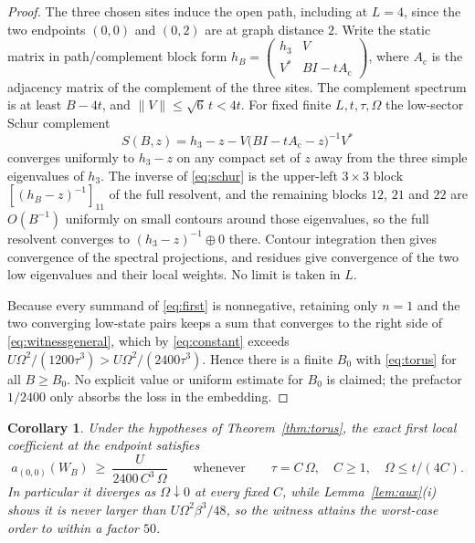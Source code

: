 \documentclass[11pt]{article}
\newtheorem{corollary}[theorem]{Corollary}
\theoremstyle{definition}
\theoremstyle{remark}
\begin{document}
\begin{proof}
The three chosen sites induce the open path, including at $L=4$, since the two
endpoints $(0,0)$ and $(0,2)$ are at graph distance $2$. Write the static matrix in
path/complement block form
$h_B=\begin{pmatrix}h_3&V\\ V^*&BI-tA_{\mathrm{c}}\end{pmatrix}$, where
$A_{\mathrm{c}}$ is the adjacency matrix of the complement of the three sites. The
complement spectrum is at least $B-4t$, and $\|V\|\le\sqrt6\,t<4t$. For fixed finite
$L,t,\tau,\Omega$ the low-sector Schur complement
\begin{equation}
S(B,z)=h_3-z-V\bigl(BI-tA_{\mathrm{c}}-z\bigr)^{-1}V^*
\label{eq:schur}
\end{equation}
converges uniformly to $h_3-z$ on any compact set of $z$ away from the three simple
eigenvalues of $h_3$. The inverse of \eqref{eq:schur} is the upper-left $3\times3$
block $[(h_B-z)^{-1}]_{11}$ of the full resolvent, and the remaining blocks
$12$, $21$ and $22$ are $O(B^{-1})$ uniformly on small contours around those
eigenvalues, so the full resolvent converges to
$(h_3-z)^{-1}\oplus0$ there. Contour integration then gives convergence of the
spectral projections, and residues give convergence of the two low eigenvalues and
their local weights. No limit is taken in $L$.

Because every summand of \eqref{eq:first} is nonnegative, retaining only $n=1$ and
the two converging low-state pairs keeps a sum that converges to the right side of
\eqref{eq:witnessgeneral}, which by \eqref{eq:constant} exceeds
$U\Omega^2/(1200\tau^3)>U\Omega^2/(2400\tau^3)$. Hence there is a finite $B_0$ with
\eqref{eq:torus} for all $B\ge B_0$. No explicit value or uniform estimate for $B_0$
is claimed; the prefactor $1/2400$ only absorbs the loss in the embedding.
\end{proof}

\begin{corollary}
\label{cor:scale}
Under the hypotheses of Theorem~\ref{thm:torus}, the exact first local coefficient at
the endpoint satisfies
\begin{equation}
a_{(0,0)}(W_B)\ \ge\ \frac{U}{2400\,C^3\,\Omega}
\qquad\text{whenever}\qquad \tau=C\,\Omega,\quad C\ge1,\quad \Omega\le t/(4C).
\label{eq:linear}
\end{equation}
In particular it diverges as $\Omega\downarrow0$ at every fixed $C$, while
Lemma~\ref{lem:aux}(i) shows it is never larger than $U\Omega^2\beta^3/48$, so the
witness attains the worst-case order to within a factor $50$.
\end{corollary}
\end{document}

